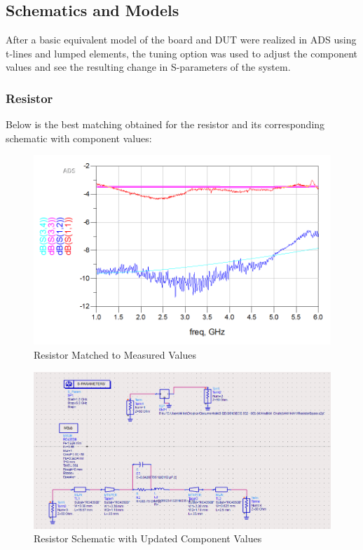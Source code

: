 \documentclass{article} %
\begin{document}
	\subsection{Schematics and Models}
	After a basic equivalent model of the board and DUT were realized in ADS using t-lines and lumped elements, the tuning option was used to adjust the component values and see the resulting change in S-parameters of the system.
	
	\subsubsection{Resistor}
	Below is the best matching obtained for the resistor and its corresponding schematic with component values:
	
	\begin{figure}[h]
		\centering
		\caption{Resistor Matched to Measured Values}
		\includegraphics[scale=.6]{ResistorMatched}
	\end{figure}
	
	
	\begin{figure}[h]
		\centering
		\caption{Resistor Schematic with Updated Component Values}
		\includegraphics[scale=.5]{ResistorMatched_schematic}
	\end{figure}
	
\end{document}
